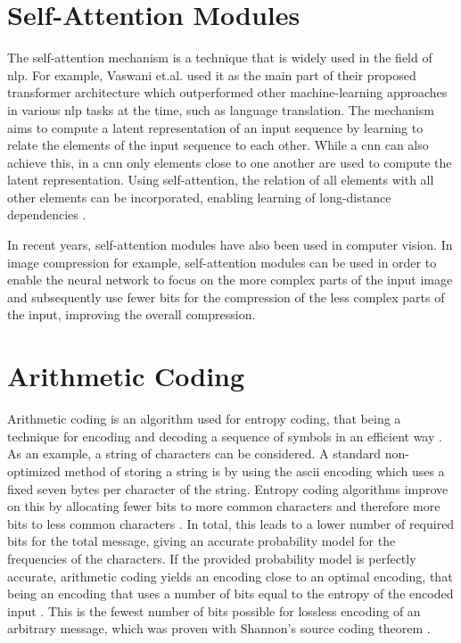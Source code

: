 \section{Self-Attention Modules}
The self-attention mechanism is a technique that is widely used in the field of \ac{nlp}. For example, Vaswani et.al. \citep{vaswani_attention_2017} used it as the main part of their proposed transformer architecture which outperformed other machine-learning approaches in various \ac{nlp} tasks at the time, such as language translation. The mechanism aims to compute a latent representation of an input sequence by learning to relate the elements of the input sequence to each other. While a \ac{cnn} can also achieve this, in a \ac{cnn} only elements close to one another are used to compute the latent representation. Using self-attention, the relation of all elements with all other elements can be incorporated, enabling learning of long-distance dependencies \citep{vaswani_attention_2017}.

In recent years, self-attention modules have also been used in computer vision. In image compression for example, self-attention modules can be used in order to enable the neural network to focus on the more complex parts of the input image and subsequently use fewer bits for the compression of the less complex parts of the input, improving the overall compression\citep{cheng_learned_2020, liu_non-local_2019}. 

\section{Arithmetic Coding}
\label{sec:arithmetic}
Arithmetic coding is an algorithm used for entropy coding, that being a technique for encoding and decoding a sequence of symbols in an efficient way \citep{witten_arithmetic_1987}. As an example, a string of characters can be considered. A standard non-optimized method of storing a string is by using the \ac{ascii} encoding which uses a fixed seven bytes per character of the string. Entropy coding algorithms improve on this by allocating fewer bits to more common characters and therefore more bits to less common characters \citep{witten_arithmetic_1987}. In total, this leads to a lower number of required bits for the total message, giving an accurate probability model for the frequencies of the characters. If the provided probability model is perfectly accurate, arithmetic coding yields an encoding close to an optimal encoding, that being an encoding that uses a number of bits equal to the entropy of the encoded input \citep{witten_arithmetic_1987}. This is the fewest number of bits possible for lossless encoding of an arbitrary message, which was proven with Shannon's source coding theorem \citep{shannon_mathematical_1948,mackay_information_2003}.


